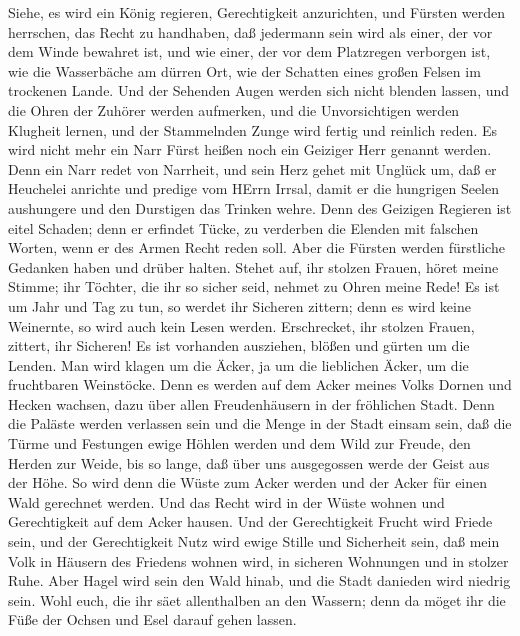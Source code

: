  Siehe, es wird ein König regieren, Gerechtigkeit
anzurichten, und Fürsten werden herrschen, das Recht zu handhaben,
 daß jedermann sein wird als einer, der vor dem Winde
bewahret ist, und wie einer, der vor dem Platzregen verborgen ist, wie
die Wasserbäche am dürren Ort, wie der Schatten eines großen Felsen im
trockenen Lande.  Und der Sehenden Augen werden sich nicht
blenden lassen, und die Ohren der Zuhörer werden aufmerken, 
und die Unvorsichtigen werden Klugheit lernen, und der Stammelnden Zunge
wird fertig und reinlich reden.  Es wird nicht mehr ein Narr
Fürst heißen noch ein Geiziger Herr genannt werden.  Denn
ein Narr redet von Narrheit, und sein Herz gehet mit Unglück um, daß er
Heuchelei anrichte und predige vom HErrn Irrsal, damit er die hungrigen
Seelen aushungere und den Durstigen das Trinken wehre.  Denn
des Geizigen Regieren ist eitel Schaden; denn er erfindet Tücke, zu
verderben die Elenden mit falschen Worten, wenn er des Armen Recht reden
soll.  Aber die Fürsten werden fürstliche Gedanken haben und
drüber halten.  Stehet auf, ihr stolzen Frauen, höret meine
Stimme; ihr Töchter, die ihr so sicher seid, nehmet zu Ohren meine Rede!
 Es ist um Jahr und Tag zu tun, so werdet ihr Sicheren
zittern; denn es wird keine Weinernte, so wird auch kein Lesen werden.
 Erschrecket, ihr stolzen Frauen, zittert, ihr Sicheren! Es
ist vorhanden ausziehen, blößen und gürten um die Lenden. 
Man wird klagen um die Äcker, ja um die lieblichen Äcker, um die
fruchtbaren Weinstöcke.  Denn es werden auf dem Acker
meines Volks Dornen und Hecken wachsen, dazu über allen Freudenhäusern
in der fröhlichen Stadt.  Denn die Paläste werden verlassen
sein und die Menge in der Stadt einsam sein, daß die Türme und Festungen
ewige Höhlen werden und dem Wild zur Freude, den Herden zur Weide,
 bis so lange, daß über uns ausgegossen werde der Geist aus
der Höhe. So wird denn die Wüste zum Acker werden und der Acker für
einen Wald gerechnet werden.  Und das Recht wird in der
Wüste wohnen und Gerechtigkeit auf dem Acker hausen.  Und
der Gerechtigkeit Frucht wird Friede sein, und der Gerechtigkeit Nutz
wird ewige Stille und Sicherheit sein,  daß mein Volk in
Häusern des Friedens wohnen wird, in sicheren Wohnungen und in stolzer
Ruhe.  Aber Hagel wird sein den Wald hinab, und die Stadt
danieden wird niedrig sein.  Wohl euch, die ihr säet
allenthalben an den Wassern; denn da möget ihr die Füße der Ochsen und
Esel darauf gehen lassen.

